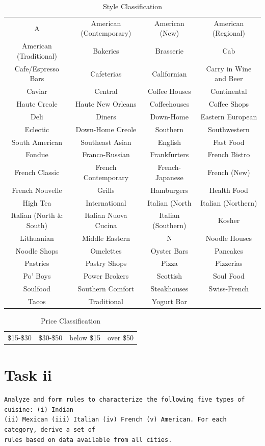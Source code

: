 \documentclass[letterpaper,10pt]{article}
\begin{document}
\begin{table}[h]
\centering
\caption{Style Classification}
\begin{tabu}{cccc}
A & American (Contemporary) & American (New) & American (Regional) \\
American (Traditional) & Bakeries & Brasserie & Cab \\
Cafe/Espresso Bars & Cafeterias & Californian & Carry in Wine and Beer \\
Caviar & Central & Coffee Houses & Continental \\
Haute Creole & Haute New Orleans & Coffeehouses & Coffee Shops \\
Deli & Diners & Down-Home & Eastern European \\
Eclectic & Down-Home Creole & Southern & Southwestern \\
South American & Southeast Asian & English & Fast Food \\
Fondue & Franco-Russian & Frankfurters & French Bistro \\
French Classic & French Contemporary & French-Japanese & French (New) \\
French Nouvelle & Grills & Hamburgers & Health Food \\
High Tea & International & Italian (North & Italian (Northern) \\
Italian (North \& South) & Italian Nuova Cucina & Italian (Southern) & Kosher \\
Lithuanian & Middle Eastern & N & Noodle Houses \\
Noodle Shops & Omelettes & Oyster Bars & Pancakes \\
Pastries & Pastry Shops & Pizza & Pizzerias \\
Po' Boys & Power Brokers & Scottish & Soul Food \\
Soulfood & Southern Comfort & Steakhouses & Swiss-French \\
Tacos & Traditional & Yogurt Bar & \\
\end{tabu}
\end{table}

\begin{table}[h]
\centering
\caption{Price Classification}
\begin{tabu}{cccc}
\$15-\$30 & \$30-\$50 & below \$15 & over \$50 \\
\end{tabu}
\end{table}
\clearpage
\newpage
{}
\section*{Task ii}
\begin{verbatim}
Analyze and form rules to characterize the following five types of cuisine: (i) Indian
(ii) Mexican (iii) Italian (iv) French (v) American. For each category, derive a set of
rules based on data available from all cities.
\end{verbatim}
\end{document}
